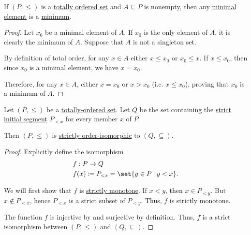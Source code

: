 \begin{proposition}\label{thm:totally_ordered_minimal_element_is_minimum}
  If \( (P, \leq) \) is a \hyperref[def:totally_ordered_set]{totally ordered set} and \( A \subseteq P \) is nonempty, then any \hyperref[def:partially_ordered_set_extremal_points/maximal_and_minimal_element]{minimal element} is a \hyperref[def:partially_ordered_set_extremal_points/maximum_and_minimum]{minimum}.
\end{proposition}
\begin{proof}
  Let \( x_0 \) be a minimal element of \( A \). If \( x_0 \) is the only element of \( A \), it is clearly the minimum of \( A \). Suppose that \( A \) is not a singleton set.

  By definition of total order, for any \( x \in A \) either \( x \leq x_0 \) or \( x_0 \leq x \). If \( x \leq x_0 \), then since \( x_0 \) is a minimal element, we have \( x = x_0 \).

  Therefore, for any \( x \in A \), either \( x = x_0 \) or \( x > x_0 \) (i.e. \( x \leq x_0 \)), proving that \( x_0 \) is a minimum of \( A \).
\end{proof}

\begin{proposition}\label{thm:totally_ordered_segment_isomorphism}
  Let \( (P, \leq) \) be a \hyperref[def:totally_ordered_set]{totally-ordered set}. Let \( Q \) be the set containing the \hyperref[def:partially_ordered_set_interval/ray]{strict initial segment} \( P_{<x} \) for every member \( x \) of \( P \).

  Then \( (P, \leq) \) is \hyperref[def:partially_ordered_set/homomorphism]{strictly order-isomorphic} to \( (Q, \subseteq) \).
\end{proposition}
\begin{proof}
  Explicitly define the isomorphism
  \begin{equation*}
    \begin{aligned}
      &f: P \to Q \\
      &f(x) \coloneqq P_{<x} = \set{ y \in P \given y < x }.
    \end{aligned}
  \end{equation*}

  We will first show that \( f \) is \hyperref[def:partially_ordered_set/homomorphism]{strictly monotone}. If \( x < y \), then \( x \in P_{<y} \). But \( x \not\in P_{<x} \), hence \( P_{<x} \) is a strict subset of \( P_{<y} \). Thus, \( f \) is strictly monotone.

  The function \( f \) is injective by  and surjective by definition. Thus, \( f \) is a strict isomorphism between \( (P, \leq) \) and \( (Q, \subseteq) \).
\end{proof}

